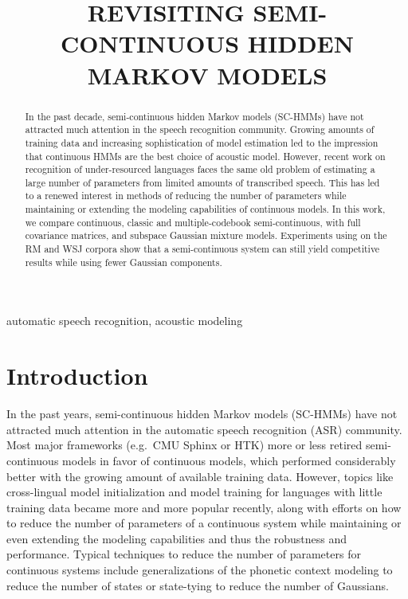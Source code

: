 \documentclass{article}
\title{REVISITING SEMI-CONTINUOUS HIDDEN MARKOV MODELS}
\begin{document}
\ninept

\maketitle

\begin{abstract}
In the past decade, semi-continuous hidden Markov models (SC-HMMs) have not 
attracted much attention in the speech recognition community. Growing amounts 
of training data and increasing sophistication of model estimation led to the 
impression that continuous HMMs are the best choice of acoustic model.
%
However, recent work on recognition of under-resourced languages faces the same
old problem of estimating a large number of parameters from limited amounts 
of transcribed speech.
This has led to a renewed interest in methods of reducing the number of parameters 
while maintaining or extending the modeling capabilities of continuous models.
%
In this work, we compare continuous, classic and multiple-codebook semi-continuous,
with full covariance matrices, and subspace Gaussian mixture models.
%
Experiments using on the RM and WSJ corpora show that a semi-continuous system
can still yield competitive results while using fewer Gaussian components.
\end{abstract}

\begin{keywords}
automatic speech recognition, acoustic modeling
\end{keywords}

\section{Introduction}
\label{sec:intro}
In the past years, semi-continuous hidden Markov models (SC-HMMs) \cite{huang1989shm}
have not attracted much attention in the automatic speech recognition (ASR) community. 
Most major frameworks (e.g.~CMU {\sc Sphinx} or HTK) more or less retired
semi-continuous models in favor of continuous models, which performed 
considerably better with the growing amount of available training data.
%
However, topics like cross-lingual model initialization and model training
for languages with little training data became more and more popular recently,
along with efforts on how to reduce the number of parameters of a continuous
system while maintaining or even extending the modeling capabilities and thus
the robustness and performance.
%
Typical techniques to reduce the number of parameters for continuous
systems include generalizations of the phonetic context modeling to reduce the 
number of states or state-tying to reduce the number of Gaussians.
\end{document}
